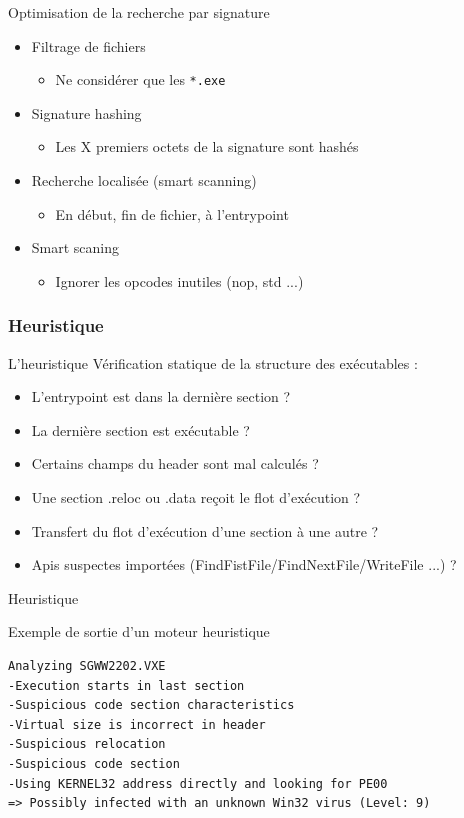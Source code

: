 \documentclass{beamer}
\begin{document}
\begin{frame}{Optimisation de la recherche par signature}
\begin{itemize}
\item Filtrage de fichiers
\begin{itemize}
\item Ne considérer que les \texttt{*.exe}
\end{itemize}
\item Signature hashing
\begin{itemize}
\item Les X premiers octets de la signature sont hashés
\end{itemize}
\item Recherche localisée (smart scanning)
\begin{itemize}
\item En début, fin de fichier, à l'entrypoint
\end{itemize}
\item Smart scaning
\begin{itemize}
\item Ignorer les opcodes inutiles (nop, std ...)
\end{itemize}
\end{itemize}
\end{frame}

\subsubsection{Heuristique}
\begin{frame}{L'heuristique}
Vérification statique de la structure des exécutables :
\begin{itemize}
\item L'entrypoint est dans la dernière section ?
\item La dernière section est exécutable ?
\item Certains champs du header sont mal calculés ?
\item Une section .reloc ou .data reçoit le flot d'exécution ?
\item  Transfert du flot d'exécution d'une section à une autre ?
\item Apis suspectes importées (FindFistFile/FindNextFile/WriteFile ...) ?
\end{itemize}
\end{frame}

\begin{frame}[fragile]{Heuristique}
\begin{exampleblock}{Exemple de sortie d'un moteur heuristique}
\begin{lstlisting}[langage=java]
Analyzing SGWW2202.VXE
-Execution starts in last section
-Suspicious code section characteristics
-Virtual size is incorrect in header
-Suspicious relocation
-Suspicious code section 
-Using KERNEL32 address directly and looking for PE00
=> Possibly infected with an unknown Win32 virus (Level: 9)
\end{lstlisting}
\end{exampleblock}
\end{frame}
\end{document}
